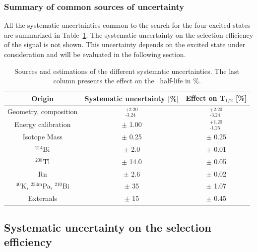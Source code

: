 \documentclass[main.tex]{subfiles}
\begin{document}
\FloatBarrier


\subsubsection{Summary of common sources of uncertainty}


\NI All the systematic uncertainties common to the search for the four excited states are summarized in Table~\ref{Table:SystCurrent}. The systematic uncertainty on the selection efficiency of the signal is not shown. This uncertainty depends on the excited state under consideration and will be evaluated in the following section.


\begin{table}
\centering
\begin{tabular}{c|c|c}
Origin                                   & Systematic uncertainty [\%] & Effect on T$_{\text{1/2}}$ [\%] \\[0.1cm]
\toprule
Geometry, composition                    & $^{\text{+2.20}}_{\text{-3.24}}$ & $^{\text{+2.20}}_{\text{-3.24}}$ \\[0.1cm]
\hline
Energy calibration                       & $\pm$ 1.00                       & $^{\text{+1.20}}_{\text{-1.25}}$ \\[0.1cm]
\hline
Isotope Mass                             & $\pm$ 0.25                       & $\pm$ 0.25 \\[0.1cm]
\hline
$^{\text{214}}$Bi                        & $\pm$ 2.0                        & $\pm$ 0.01 \\[0.1cm]
\hline
$^{\text{208}}$Tl                        & $\pm$ 14.0                       & $\pm$ 0.05 \\[0.1cm]
\hline
Rn                                       & $\pm$ 2.6                        & $\pm$ 0.02 \\[0.1cm]
\hline
$^{\text{40}}$K, $^{\text{234m}}$Pa, $^{\text{210}}$Bi & $\pm$ 35           & $\pm$ 1.07 \\[0.1cm]
\hline
Externals                                & $\pm$ 15                         & $\pm$ 0.45 \\[0.1cm]
\bottomrule
\end{tabular}
\caption{Sources and estimations of the different systematic uncertainties. The last column presents the effect on the \Cd~half-life in \%.}
\label{Table:SystCurrent}
\end{table}


\FloatBarrier


\subsection{Systematic uncertainty on the selection efficiency}\label{sec:SystematicsEvaluationEff}
\end{document}

